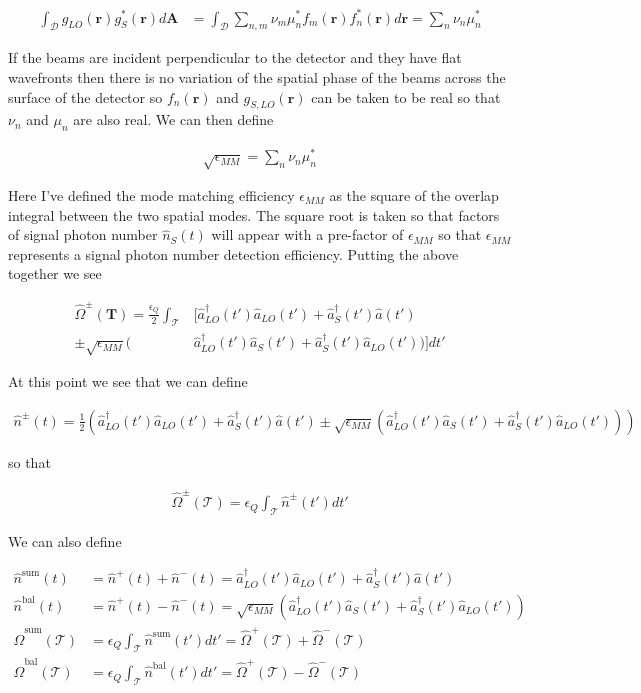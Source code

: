 \documentclass[12pt]{article}
\newcommand{\ep}{\epsilon}
\newcommand{\bv}[1]{\boldsymbol{#1}}
\newcommand{\mc}[1]{\mathcal{#1}}
\begin{document}
\begin{align}
\int_{\mc{D}}g_{LO}(\bv{r})g_S^*(\bv{r}) d\bv{A} &= \int_{\mc{D}}\sum_{n,m}\nu_m\mu^*_n f_m(\bv{r})f^*_n(\bv{r})d\bv{r} = \sum_n \nu_n\mu^*_n
\end{align}

If the beams are incident perpendicular to the detector and they have flat wavefronts then there is no variation of the spatial phase of the beams across the surface of the detector so $f_n(\bv{r})$ and $g_{S,LO}(\bv{r})$ can be taken to be real so that $\nu_n$ and $\mu_n$ are also real. We can then define

\begin{align}
\sqrt{\ep_{MM}} = \sum_n \nu_n\mu^*_n
\end{align}

Here I've defined the mode matching efficiency $\ep_{MM}$ as the square of the overlap integral between the two spatial modes. The square root is taken so that factors of signal photon number $\hat{n}_S(t)$ will appear with a pre-factor of $\ep_{MM}$ so that $\ep_{MM}$ represents a signal photon number detection efficiency. Putting the above together we see

\begin{align}
\hat{\Omega}^{\pm}(\bv{T}) = \frac{\ep_Q}{2}\int_{\mc{T}} &\Big[\hat{a}^{\dag}_{LO}(t')\hat{a}_{LO}(t') + \hat{a}^{\dag}_S(t')\hat{a}(t')\\
\pm\sqrt{\ep_{MM}}(&\hat{a}_{LO}^{\dag}(t')\hat{a}_S(t') + \hat{a}^{\dag}_S(t')\hat{a}_{LO}(t'))\Big]dt'
\end{align}

At this point we see that we can define

\begin{align}
\hat{n}^{\pm}(t) = \frac{1}{2}\left(\hat{a}^{\dag}_{LO}(t')\hat{a}_{LO}(t') + \hat{a}^{\dag}_S(t')\hat{a}(t')
\pm\sqrt{\ep_{MM}}(\hat{a}_{LO}^{\dag}(t')\hat{a}_S(t') + \hat{a}^{\dag}_S(t')\hat{a}_{LO}(t'))\right)
\end{align}

so that

\begin{align}
\hat{\Omega}^{\pm}(\mc{T}) = \ep_Q\int_{\mc{T}}\hat{n}^{\pm}(t')dt'
\end{align}

We can also define

\begin{align}
\label{eq:nbal}
\hat{n}^{\text{sum}}(t) &= \hat{n}^+(t)+\hat{n}^-(t) = \hat{a}^{\dag}_{LO}(t')\hat{a}_{LO}(t') + \hat{a}^{\dag}_S(t')\hat{a}(t')\\
\hat{n}^{\text{bal}}(t) &= \hat{n}^+(t)-\hat{n}^-(t)= \sqrt{\ep_{MM}}(\hat{a}_{LO}^{\dag}(t')\hat{a}_S(t') + \hat{a}^{\dag}_S(t')\hat{a}_{LO}(t'))\\
\hat{\Omega}^{\text{sum}}(\mc{T}) &= \ep_Q\int_{\mc{T}}\hat{n}^{\text{sum}}(t')dt' = \hat{\Omega}^+(\mc{T}) + \hat{\Omega}^-(\mc{T})\\
\hat{\Omega}^{\text{bal}}(\mc{T}) &= \ep_Q\int_{\mc{T}}\hat{n}^{\text{bal}}(t')dt'= \hat{\Omega}^+(\mc{T}) - \hat{\Omega}^-(\mc{T})\\
\end{align}
\end{document}

